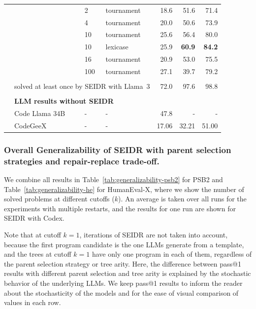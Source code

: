 \begin{table}[t]
\begin{tabular}{llllrrr}
       &        & 2   &         tournament &    18.6 &     51.6 &      71.4 \\
       &        & 4   &         tournament &    20.0 &     50.6 &      73.9 \\
       &        & 10  &         tournament &    25.6 &     56.4 &      80.0 \\
       &        & 10  &           lexicase &    25.9 &     \textbf{60.9} &      \textbf{84.2} \\
       &        & 16  &         tournament &    20.9 &     53.0 &      75.5 \\
       &        & 100 &         tournament &    27.1 &     39.7 &      79.2 \\[1pt]
\cline{3-7}\\[-8pt]
       & \multicolumn{3}{l}{solved at least once by SEIDR with Llama~3} & 72.0 &     97.6 &      98.8  \\[1pt]
\cline{2-7}\\[-8pt]
& \multicolumn{6}{l}{\textbf{LLM results without SEIDR}} \\
& Code Llama 34B & - &  - &  47.8  &  -   &    - \\
& CodeGeeX & - &  - &  17.06  &  32.21   &    51.00 \\[-2pt]
\bottomrule
\end{tabular}
\end{table}

\subsubsection{Overall Generalizability of SEIDR with parent selection strategies and repair-replace trade-off.}
\label{sec:seidr-overall-generalizability}

We combine all results in Table~\ref{tab:generalizability-psb2} for PSB2 and Table~\ref{tab:generalizability-he} for HumanEval-X, where we show the number of solved problems at different cutoffs ($k$).  
An average is taken over all runs for the experiments with multiple restarts, and the results for one run are shown for SEIDR with Codex. 

Note that at cutoff $k=1$, iterations of SEIDR are not taken into account, because the first program candidate is the one LLMs generate from a template, and the trees at cutoff $k=1$ have only one program in each of them, regardless of the parent selection strategy or tree arity. 
Here, the difference between pass@1 results with different parent selection and tree arity is explained by the stochastic behavior of the underlying LLMs. 
We keep pass@1 results to inform the reader about the stochasticity of the models and for the ease of visual comparison of values in each row.

